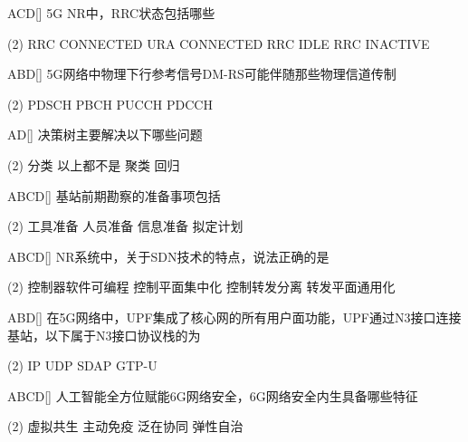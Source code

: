 \begin{choice}{\;ACD\;}[]
    5G NR中，RRC状态包括哪些
    \begin{tasks}(2)
        \task RRC CONNECTED
        \task URA CONNECTED
        \task  RRC IDLE
        \task RRC INACTIVE
    \end{tasks}
\end{choice}

\begin{choice}{\;ABD\;}[]
    5G网络中物理下行参考信号DM-RS可能伴随那些物理信道传制
    \begin{tasks}(2)
        \task PDSCH
        \task PBCH
        \task PUCCH
        \task PDCCH
    \end{tasks}
\end{choice}

\begin{choice}{\;AD\;}[]
    决策树主要解决以下哪些问题

    \begin{tasks}(2)
        \task 分类
        \task 以上都不是
        \task 聚类
        \task 回归
    \end{tasks}
\end{choice}

\begin{choice}{\;ABCD\;}[]
    基站前期勘察的准备事项包括
    \begin{tasks}(2)
        \task 工具准备
        \task 人员准备
        \task 信息准备
        \task 拟定计划
    \end{tasks}
\end{choice}

\begin{choice}{\;ABCD\;}[]
    NR系统中，关于SDN技术的特点，说法正确的是
    \begin{tasks}(2)
        \task 控制器软件可编程
        \task 控制平面集中化
        \task 控制转发分离
        \task 转发平面通用化
    \end{tasks}
\end{choice}

\begin{choice}{\;ABD\;}[]
    在5G网络中，UPF集成了核心网的所有用户面功能，UPF通过N3接口连接基站，以下属于N3接口协议栈的为
    \begin{tasks}(2)
        \task IP
        \task UDP
        \task SDAP
        \task GTP-U
    \end{tasks}
\end{choice}

\begin{choice}{\;ABCD\;}[]
    人工智能全方位赋能6G网络安全，6G网络安全内生具备哪些特征
    \begin{tasks}(2)
        \task 虚拟共生
        \task 主动免疫
        \task 泛在协同
        \task 弹性自治
    \end{tasks}
\end{choice}

